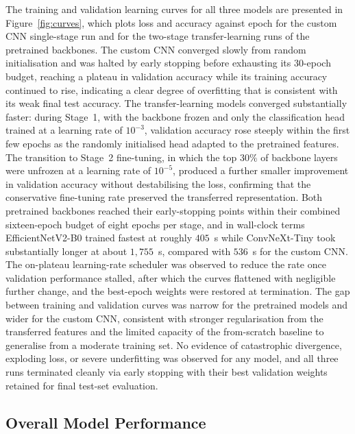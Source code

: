 The training and validation learning curves for all three models are presented in Figure~\ref{fig:curves}, which plots loss and accuracy against epoch for the custom CNN single-stage run and for the two-stage transfer-learning runs of the pretrained backbones.
The custom CNN converged slowly from random initialisation and was halted by early stopping before exhausting its $30$-epoch budget, reaching a plateau in validation accuracy while its training accuracy continued to rise, indicating a clear degree of overfitting that is consistent with its weak final test accuracy.
The transfer-learning models converged substantially faster: during Stage~1, with the backbone frozen and only the classification head trained at a learning rate of $10^{-3}$, validation accuracy rose steeply within the first few epochs as the randomly initialised head adapted to the pretrained features.
The transition to Stage~2 fine-tuning, in which the top $30\%$ of backbone layers were unfrozen at a learning rate of $10^{-5}$, produced a further smaller improvement in validation accuracy without destabilising the loss, confirming that the conservative fine-tuning rate preserved the transferred representation.
Both pretrained backbones reached their early-stopping points within their combined sixteen-epoch budget of eight epochs per stage, and in wall-clock terms EfficientNetV2-B0 trained fastest at roughly $405$~s while ConvNeXt-Tiny took substantially longer at about $1{,}755$~s, compared with $536$~s for the custom CNN.
The on-plateau learning-rate scheduler was observed to reduce the rate once validation performance stalled, after which the curves flattened with negligible further change, and the best-epoch weights were restored at termination.
The gap between training and validation curves was narrow for the pretrained models and wider for the custom CNN, consistent with stronger regularisation from the transferred features and the limited capacity of the from-scratch baseline to generalise from a moderate training set.
No evidence of catastrophic divergence, exploding loss, or severe underfitting was observed for any model, and all three runs terminated cleanly via early stopping with their best validation weights retained for final test-set evaluation.

\subsection{Overall Model Performance}
\label{subsec:res-overall}


